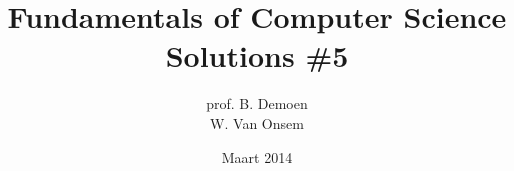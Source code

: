 \documentclass{article}
\title{Fundamentals of Computer Science\\Solutions \#5}
\author{prof. B. Demoen\\W. Van Onsem}
\date{Maart 2014}
\begin{document}
\maketitle
\begin{exercise}
\end{exercise}
\end{document}
